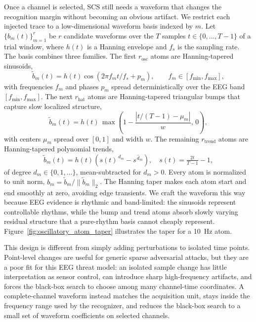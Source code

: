 \documentclass[journal]{IEEEtran}
\begin{document}
Once a channel is selected, SCS still needs a waveform that changes the recognition margin without becoming an obvious artifact. We restrict each injected trace to a low-dimensional waveform basis indexed by $m$. Let $\{b_m(t)\}_{m=1}^{r}$ be $r$ candidate waveforms over the $T$ samples $t\in\{0,\ldots,T-1\}$ of a trial window, where $h(t)$ is a Hanning envelope and $f_s$ is the sampling rate. The basis combines three families. The first $r_{\mathrm{osc}}$ atoms are Hanning-tapered sinusoids,
\begin{equation}
\tilde{b}_m(t)=h(t)\cos\!\left(2\pi f_m t/f_s+p_m\right),
\qquad f_m\in[f_{\min},f_{\max}],
\label{eq:basis}
\end{equation}
with frequencies $f_m$ and phases $p_m$ spread deterministically over the EEG band $[f_{\min},f_{\max}]$. The next $r_{\mathrm{hat}}$ atoms are Hanning-tapered triangular bumps that capture slow localized structure,
\begin{equation}
\tilde{b}_m(t)=h(t)\,\max\!\left(1-\frac{|t/(T-1)-\mu_m|}{w},\,0\right),
\label{eq:basis_hat}
\end{equation}
with centers $\mu_m$ spread over $[0,1]$ and width $w$. The remaining $r_{\mathrm{trend}}$ atoms are Hanning-tapered polynomial trends,
\begin{equation}
\tilde{b}_m(t)=h(t)\left(s(t)^{\,d_m}-\overline{s^{\,d_m}}\right),
\quad s(t)=\tfrac{2t}{T-1}-1,
\label{eq:basis_trend}
\end{equation}
of degree $d_m\in\{0,1,\ldots\}$, mean-subtracted for $d_m>0$. Every atom is normalized to unit norm, $b_m=\tilde{b}_m/\|\tilde{b}_m\|_2$. The Hanning taper makes each atom start and end smoothly at zero, avoiding edge transients. We craft the waveform this way because EEG evidence is rhythmic and band-limited: the sinusoids represent controllable rhythms, while the bump and trend atoms absorb slowly varying residual structure that a pure-rhythm basis cannot cheaply represent. Figure~\ref{fig:oscillatory_atom_taper} illustrates the taper for a 10~Hz atom.

This design is different from simply adding perturbations to isolated time points. Point-level changes are useful for generic sparse adversarial attacks, but they are a poor fit for this EEG threat model: an isolated sample change has little interpretation as sensor control, can introduce sharp high-frequency artifacts, and forces the black-box search to choose among many channel-time coordinates. A complete-channel waveform instead matches the acquisition unit, stays inside the frequency range used by the recognizer, and reduces the black-box search to a small set of waveform coefficients on selected channels.
\end{document}
